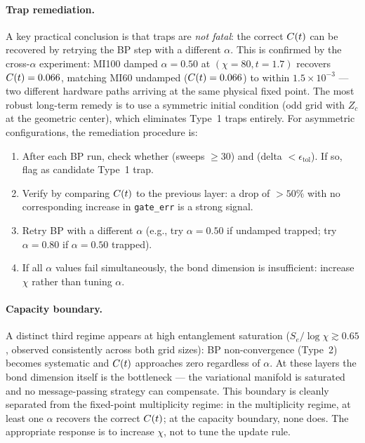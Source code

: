 \paragraph{Trap remediation.}
A key practical conclusion is that traps are \emph{not fatal}: the correct
$C(t)$ can be recovered by retrying the BP step with a different $\alpha$.
This is confirmed by the cross-$\alpha$ experiment: MI100 damped $\alpha=0.50$
at $(\chi=80, t=1.7)$ recovers $C(t) = 0.066$, matching MI60 undamped
($C(t) = 0.066$) to within $1.5\times10^{-3}$ --- two different hardware paths
arriving at the same physical fixed point.
The most robust long-term remedy is to use a symmetric initial condition
(odd grid with $Z_c$ at the geometric center), which eliminates Type~1 traps
entirely.
For asymmetric configurations, the remediation procedure is:
\begin{enumerate}
  \item After each BP run, check whether (sweeps $\geq 30$) and
        (delta $< \epsilon_{\mathrm{tol}}$).
        If so, flag as candidate Type~1 trap.
  \item Verify by comparing $C(t)$ to the previous layer: a drop of $>50\%$
        with no corresponding increase in \texttt{gate\_err} is a strong signal.
  \item Retry BP with a different $\alpha$ (e.g., try $\alpha=0.50$ if
        undamped trapped; try $\alpha=0.80$ if $\alpha=0.50$ trapped).
  \item If all $\alpha$ values fail simultaneously, the bond dimension is
        insufficient: increase $\chi$ rather than tuning $\alpha$.
\end{enumerate}

\paragraph{Capacity boundary.}
A distinct third regime appears at high entanglement saturation
($S_e/\log\chi \gtrsim 0.65$, observed consistently across both grid sizes):
BP non-convergence (Type~2) becomes systematic and $C(t)$ approaches zero
regardless of $\alpha$.
At these layers the bond dimension itself is the bottleneck --- the variational
manifold is saturated and no message-passing strategy can compensate.
This boundary is cleanly separated from the fixed-point multiplicity regime:
in the multiplicity regime, at least one $\alpha$ recovers the correct $C(t)$;
at the capacity boundary, none does.
The appropriate response is to increase $\chi$, not to tune the update rule.

